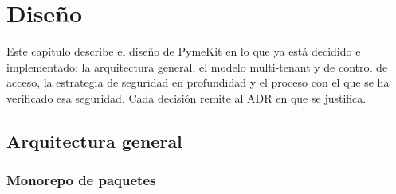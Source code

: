 
\chapter{Diseño}
\label{cap:diseno}


Este capítulo describe el diseño de PymeKit en lo que ya está decidido e
implementado: la arquitectura general, el modelo multi-tenant y de control de
acceso, la estrategia de seguridad en profundidad y el proceso con el que se
ha verificado esa seguridad. Cada decisión remite al ADR en que se justifica.


\section{Arquitectura general}
\label{sec:arquitectura}

\subsection{Monorepo de paquetes}

